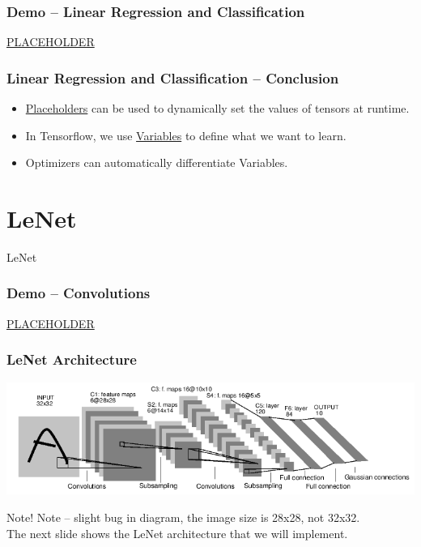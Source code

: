 \documentclass{beamer}
\begin{document}
\begin{frame}
  \frametitle{Demo -- Linear Regression and Classification}
  \Huge{\centerline{\href{PLACEHOLDER}{PLACEHOLDER}}}
\end{frame}

\begin{frame}
  \frametitle{Linear Regression and Classification -- Conclusion}
  \begin{itemize}
  \item \underline{Placeholders} can be used to dynamically set the values of tensors at runtime.
  \item In Tensorflow, we use \underline{Variables} to define what we want to learn.
  \item Optimizers can automatically differentiate Variables.
  \end{itemize}
\end{frame}


\section{LeNet}
\begin{frame}
  \huge{\centerline{LeNet}}
\end{frame}

\begin{frame}
  \frametitle{Demo -- Convolutions}
  \Huge{\centerline{\href{PLACEHOLDER}{PLACEHOLDER}}}
\end{frame}

\begin{frame}
  \frametitle{LeNet Architecture}
  \begin{center}
    \includegraphics[width=1.0\linewidth]{LeNet.png}
  \end{center}
\end{frame}

\begin{frame}
  \begin{block}{Note!}
    Note -- slight bug in diagram, the image size is 28x28, not 32x32. \\
    The next slide shows the LeNet architecture that we will implement.
  \end{block}
\end{frame}
\end{document}
